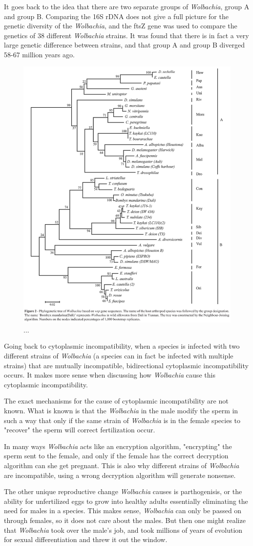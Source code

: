 \documentclass[twocolumn]{article}
\begin{document}
It goes back to the idea that there are two separate groups of \textit{Wolbachia}, group A and group B. Comparing the 16S rDNA does not give a full picture for the genetic diversity of the \textit{Wolbachia}, and the ftsZ gene was used to compare the genetics of 38 different \textit{Wolbachia} strains.\cite{Wgenetics} It was found that there is in fact a very large genetic difference between strains, and that group A and group B diverged 58-67 million years ago. 

\begin{figure}[!ht]
    \centering
    \includegraphics[width=.4\textwidth]{images/WolbachiaTree.jpg}
    \caption{ ... }
    \label{fig:wolbachiha_tree}
\end{figure}

Going back to cytoplasmic incompatibility, when a species is infected with two different strains of \textit{Wolbachia} (a species can in fact be infected with multiple strains) that are mutually incompatible, bidirectional cytoplasmic incompatibility occurs.\cite{WbiCI} It makes more sense when discussing how \textit{Wolbachia} cause this cytoplasmic incompatibility.

The exact mechanisms for the cause of cytoplasmic incompatibility are not known. What is known is that the \textit{Wolbachia} in the male modify the sperm in such a way that only if the same strain of \textit{Wolbachia} is in the female species to "recover" the sperm will correct fertilization occur.\cite{Wbio}

In many ways \textit{Wolbachia} acts like an encryption algorithm, "encrypting" the sperm sent to the female, and only if the female has the correct decryption algorithm can she get pregnant. This is also why different strains of \textit{Wolbachia} are incompatible, using a wrong decryption algorithm will generate nonsense.

The other unique reproductive change \textit{Wolbachia} causes is parthogenisis, or the ability for unfertilized eggs to grow into healthy adults essentially eliminating the need for males in a species. This makes sense, \textit{Wolbachia} can only be passed on through females, so it does not care about the males. But then one might realize that \textit{Wolbachia} took over the male's job, and took millions of years of evolution for sexual differentiation and threw it out the window.
\end{document}
